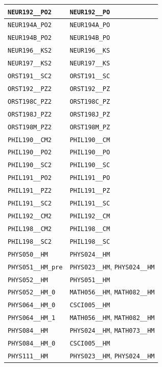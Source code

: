 \begin{longtable}{|p{4.4in}|p{4.4in}|}
    \verb|NEUR192__PO2| & \verb|NEUR192__PO|\\\hline
    \verb|NEUR194A_PO2| & \verb|NEUR194A_PO|\\\hline
    \verb|NEUR194B_PO2| & \verb|NEUR194B_PO|\\\hline
    \verb|NEUR196__KS2| & \verb|NEUR196__KS|\\\hline
    \verb|NEUR197__KS2| & \verb|NEUR197__KS|\\\hline
    \verb|ORST191__SC2| & \verb|ORST191__SC|\\\hline
    \verb|ORST192__PZ2| & \verb|ORST192__PZ|\\\hline
    \verb|ORST198C_PZ2| & \verb|ORST198C_PZ|\\\hline
    \verb|ORST198J_PZ2| & \verb|ORST198J_PZ|\\\hline
    \verb|ORST198M_PZ2| & \verb|ORST198M_PZ|\\\hline
    \verb|PHIL190__CM2| & \verb|PHIL190__CM|\\\hline
    \verb|PHIL190__PO2| & \verb|PHIL190__PO|\\\hline
    \verb|PHIL190__SC2| & \verb|PHIL190__SC|\\\hline
    \verb|PHIL191__PO2| & \verb|PHIL191__PO|\\\hline
    \verb|PHIL191__PZ2| & \verb|PHIL191__PZ|\\\hline
    \verb|PHIL191__SC2| & \verb|PHIL191__SC|\\\hline
    \verb|PHIL192__CM2| & \verb|PHIL192__CM|\\\hline
    \verb|PHIL198__CM2| & \verb|PHIL198__CM|\\\hline
    \verb|PHIL198__SC2| & \verb|PHIL198__SC|\\\hline
    \verb|PHYS050__HM| & \verb|PHYS024__HM|\\\hline
    \verb|PHYS051__HM_pre| & \verb|PHYS023__HM|, \verb|PHYS024__HM|\\\hline
    \verb|PHYS052__HM| & \verb|PHYS051__HM|\\\hline
    \verb|PHYS052__HM_0| & \verb|MATH056__HM|, \verb|MATH082__HM|\\\hline
    \verb|PHYS064__HM_0| & \verb|CSCI005__HM|\\\hline
    \verb|PHYS064__HM_1| & \verb|MATH056__HM|, \verb|MATH082__HM|\\\hline
    \verb|PHYS084__HM| & \verb|PHYS024__HM|, \verb|MATH073__HM|\\\hline
    \verb|PHYS084__HM_0| & \verb|CSCI005__HM|\\\hline
    \verb|PHYS111__HM| & \verb|PHYS023__HM|, \verb|PHYS024__HM|\\\hline

\end{longtable}
